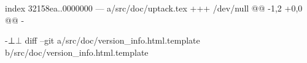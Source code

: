 index 32158ea..0000000
--- a/src/doc/uptack.tex
+++ /dev/null
@@ -1,2 +0,0 @@
-\usepackage{newunicodechar}
-\newunicodechar⊥{{$\bot$}}
diff --git a/src/doc/version_info.html.template b/src/doc/version_info.html.template
